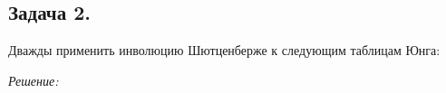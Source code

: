 \begin{figure}
	\begin{figure}[H]
	\end{figure}
\end{figure}

\newpage

\subsection*{Задача 2.}

Дважды применить инволюцию Шютценберже к следующим таблицам Юнга:
\begin{figure}[H]
\end{figure}

\noindent\textit{Решение:}

\begin{figure}
	\begin{figure}[H]
	\end{figure}
\end{figure}

